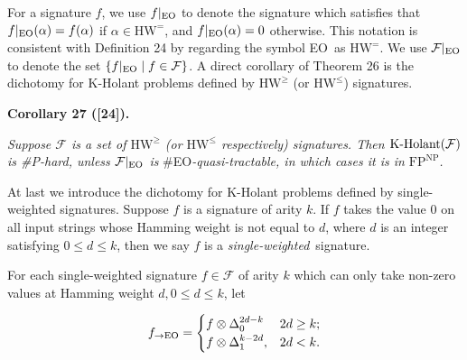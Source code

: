 \documentclass[10pt,a4paper]{article}
\begin{document}



For a signature $f$, we use $f|_{\textup{{EO}}}$ to denote the signature which satisfies that $f|_{\textup{{EO}}}(\alpha)=f(\alpha)$ if $\alpha\in\text{HW}^{=}$, and $f|_{\textup{{EO}}}(\alpha)=0$ otherwise. This notation is consistent with Definition 24 by regarding the symbol EO as $\text{HW}^{=}$. We use $\mathcal{F}|_{\textup{{EO}}}$ to denote the set $\{f|_{\textup{{EO}}}\mid f\in\mathcal{F}\}$. A direct corollary of Theorem 26 is the dichotomy for K-Holant problems defined by $\text{HW}^{\geq}$ (or $\text{HW}^{\leq}$) signatures.\par





\par\medskip\noindent\textbf{
\textbf{Corollary 27}\textbf{ }([24])\textbf{.}
}\par



\emph{Suppose $\mathcal{F}$ is a set of $\text{HW}^{\geq}$ (or $\text{HW}^{\leq}$ respectively) signatures. Then $\textup{{K-Holant}}(\mathcal{F})$ is \#P-hard, unless $\mathcal{F}|_{\textup{{EO}}}$ is }\#EO\emph{-quasi-tractable, in which cases it is in $\text{FP}^{\text{NP}}$.}\par






At last we introduce the dichotomy for K-Holant problems defined by single-weighted signatures. Suppose $f$ is a signature of arity $k$. If $f$ takes the value $0$ on all input strings whose Hamming weight is not equal to $d$, where $d$ is an integer satisfying $0\leq d\leq k$, then we say $f$ is a \emph{single-weighted} signature.\par




For each single-weighted signature $f\in\mathcal{F}$ of arity $k$ which can only take non-zero values at Hamming weight $d,0\leq d\leq k$, let\par


\[\begin{gathered}
f_{\to\textup{{EO}}}=\begin{cases}f\otimes\Delta_{0}^{2d-k}&2d\geq k;\\
f\otimes\Delta_{1}^{k-2d},&2d<k.\end{cases}
\end{gathered}\]
\end{document}
